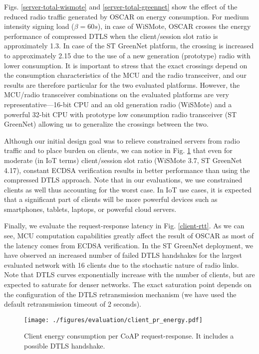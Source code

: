 \documentclass[conference]{IEEEtran}
\begin{document}
Figs. \ref{server-total-wismote} and \ref{server-total-greennet} show the effect
of the reduced radio traffic generated by OSCAR on energy consumption. For
medium intensity signing load ($\beta = 60 s$), in case of WiSMote, OSCAR
crosses the energy performance of compressed DTLS when the client/session slot
ratio is approximately 1.3. In case of the ST GreenNet platform, the crossing
is increased to approximately 2.15 due to the use of a new generation
(prototype) radio with lower consumption. It is important to stress that the
exact crossings depend on the consumption characteristics of the MCU and the radio transceiver, and our results are therefore particular for the two evaluated platforms. However, the MCU/radio transceiver combinations on the evaluated platforms are very representative---16-bit CPU and an old generation radio (WiSMote) and a powerful 32-bit CPU with prototype low consumption radio transceiver (ST GreenNet) allowing us to generalize the crossings between the two. 


Although our initial design goal was to relieve constrained servers from radio
traffic and to place burden on clients, we can notice in
Fig. \ref{client-pr-energy} that even for moderate (in IoT terms) client/session
slot ratio (WiSMote 3.7, ST GreenNet 4.17), constant ECDSA verification results
in better performance than using the compressed DTLS approach. Note that in our
evaluations, we use constrained clients as well thus accounting for the
worst case. In IoT use cases, it is expected that a significant part of clients will be more powerful devices such as smartphones, tablets, laptops, or powerful cloud servers.

Finally, we evaluate the request-response latency in
Fig. \ref{client-rtt}. As we can see, MCU computation capabilities greatly
affect the result of OSCAR as most of the latency comes from ECDSA
verification. In the ST GreenNet deployment, we have observed an increased
number of failed DTLS handshakes for the largest evaluated network with 16
clients due to the stochastic nature of radio links. Note that DTLS curves
exponentially increase with the number of clients, but are expected to saturate
for denser networks. The exact saturation point depends on the configuration of
the DTLS retransmission mechanism (we have used the default retransmission timeout of 2 seconds). 

\begin{figure}[htbp]
\centering
\texttt{[image: ./figures/evaluation/client\_pr\_energy.pdf]}
\caption{Client energy consumption per CoAP request-response. It includes a possible DTLS handshake.}
\label{client-pr-energy}
\end{figure}
\end{document}
